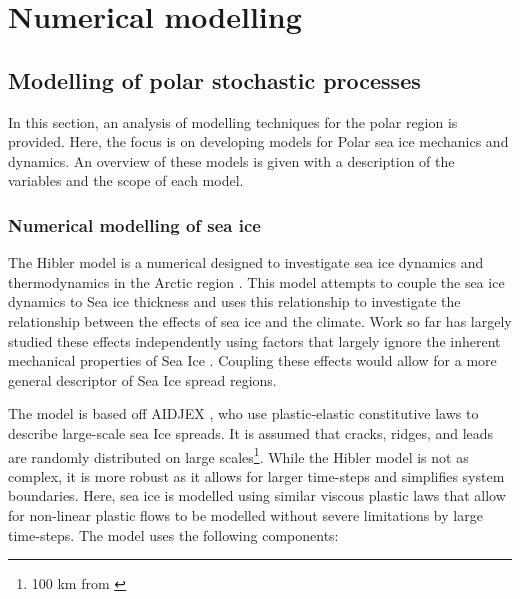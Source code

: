 \appendix

\chapter{Numerical modelling}

\section{Modelling of polar stochastic processes}
\label{app:modelling}
In this section,  an analysis of modelling techniques for the polar region is provided. Here, the focus is on developing models for Polar sea ice mechanics and dynamics. An overview of these models is given with a description of the variables and the scope of each model.

\subsection{Numerical modelling of sea ice}

The Hibler model is a numerical designed to investigate sea ice dynamics and thermodynamics in the Arctic region \cite{hibler1979dynamic}. This model attempts to couple the sea ice dynamics to Sea ice thickness and uses this relationship to investigate the relationship between the effects of sea ice and the climate. Work so far has largely studied these effects independently using factors that largely ignore the inherent mechanical properties of Sea Ice \cite{hibler1979dynamic}. Coupling these effects would allow for a more general descriptor of Sea Ice spread regions.\par

The model is based off \textcite{coon1974modeling} AIDJEX \cite{hibler1979dynamic}, who use plastic-elastic constitutive laws to describe large-scale sea Ice spreads. It is assumed that cracks, ridges, and leads are randomly distributed on large scales\footnote{100 km from \textcite{coon2007arctic}}. While the Hibler model is not as complex, it is more robust as it allows for larger time-steps and simplifies system boundaries. Here, sea ice is modelled using similar viscous plastic laws \cite{hibler1979dynamic} that allow for non-linear plastic flows to be modelled without severe limitations by large time-steps. The model uses the following components:

